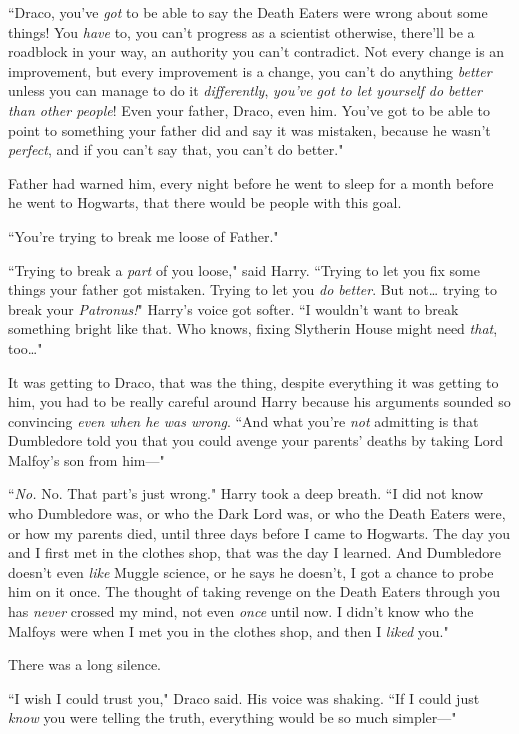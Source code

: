 ``Draco, you've \emph{got} to be able to say the Death Eaters were wrong about some things! You \emph{have} to, you can't progress as a scientist otherwise, there'll be a roadblock in your way, an authority you can't contradict. Not every change is an improvement, but every improvement is a change, you can't do anything \emph{better} unless you can manage to do it \emph{differently}, \emph{you've got to let yourself do better than other people}! Even your father, Draco, even him. You've got to be able to point to something your father did and say it was mistaken, because he wasn't \emph{perfect}, and if you can't say that, you can't do better."

Father had warned him, every night before he went to sleep for a month before he went to Hogwarts, that there would be people with this goal.

``You're trying to break me loose of Father."

``Trying to break a \emph{part} of you loose," said Harry. ``Trying to let you fix some things your father got mistaken. Trying to let you \emph{do better}. But not{\ldots} trying to break your \emph{Patronus!}" Harry's voice got softer. ``I wouldn't want to break something bright like that. Who knows, fixing Slytherin House might need \emph{that}, too{\ldots}"

It was getting to Draco, that was the thing, despite everything it was getting to him, you had to be really careful around Harry because his arguments sounded so convincing \emph{even when he was wrong}. ``And what you're \emph{not} admitting is that Dumbledore told you that you could avenge your parents' deaths by taking Lord Malfoy's son from him—"

``\emph{No.} No. That part's just wrong." Harry took a deep breath. ``I did not know who Dumbledore was, or who the Dark Lord was, or who the Death Eaters were, or how my parents died, until three days before I came to Hogwarts. The day you and I first met in the clothes shop, that was the day I learned. And Dumbledore doesn't even \emph{like} Muggle science, or he says he doesn't, I got a chance to probe him on it once. The thought of taking revenge on the Death Eaters through you has \emph{never} crossed my mind, not even \emph{once} until now. I didn't know who the Malfoys were when I met you in the clothes shop, and then I \emph{liked} you."

There was a long silence.

``I wish I could trust you," Draco said. His voice was shaking. ``If I could just \emph{know} you were telling the truth, everything would be so much simpler—"

